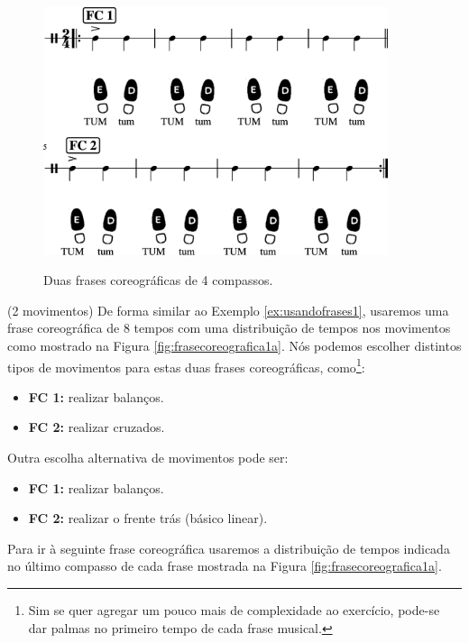 \begin{figure}[!h]
    \centering
    \href{https://drive.google.com/file/d/1bf1ubPovWLtBMlF4cHMeXXNAGH_C05kE/view?usp=sharing}{\includegraphics[width=0.9\textwidth]{chapters/cap-musicalidade/treino-fraseio0-1.eps}}
    \caption{Duas frases coreográficas de 4 compassos.}
    \label{fig:frasecoreografica0}
\end{figure}

\begin{example}(2 movimentos)
De forma similar ao Exemplo \ref{ex:usandofrases1},
usaremos uma frase coreográfica de 8 tempos com 
uma distribuição de tempos nos movimentos como mostrado na Figura \ref{fig:frasecoreografica1a}. 
Nós podemos escolher distintos tipos de movimentos para estas duas frases coreográficas, 
como\footnote{Sim 
se quer agregar um pouco mais de complexidade ao exercício,
pode-se dar palmas no primeiro tempo de cada frase musical.}:
\begin{itemize}
\item \textbf{FC 1:} realizar balanços.
\item \textbf{FC 2:} realizar cruzados.
\end{itemize}
Outra  escolha alternativa de movimentos pode ser:
\begin{itemize}
\item \textbf{FC 1:} realizar balanços.
\item \textbf{FC 2:} realizar o frente trás (básico linear).
\end{itemize}
Para ir à seguinte frase coreográfica usaremos a distribuição de tempos indicada no último compasso de cada frase 
mostrada na Figura \ref{fig:frasecoreografica1a}.
\end{example}

